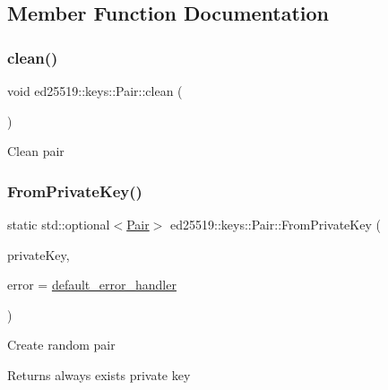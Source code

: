 \subsection{Member Function Documentation}
\mbox{\label{classed25519_1_1keys_1_1_pair_ae803e41096e0f6edb030e48713515aa2}} 
\subsubsection{\texorpdfstring{clean()}{clean()}}
{\footnotesize\ttfamily void ed25519\+::keys\+::\+Pair\+::clean (\begin{DoxyParamCaption}{ }\end{DoxyParamCaption})}

Clean pair \mbox{\label{classed25519_1_1keys_1_1_pair_aa4b34f7823cbba1e4243b9fbf2745e1e}} 
\subsubsection{\texorpdfstring{FromPrivateKey()}{FromPrivateKey()}}
{\footnotesize\ttfamily static std\+::optional$<$\mbox{\hyperlink{classed25519_1_1keys_1_1_pair}{Pair}}$>$ ed25519\+::keys\+::\+Pair\+::\+From\+Private\+Key (\begin{DoxyParamCaption}\item[{const std\+::string \&}]{private\+Key,  }\item[{const \mbox{\hyperlink{namespaceed25519_a6ba572942b3c18591fc869d52a6b16e6}{Error\+Handler}} \&}]{error = {\ttfamily \mbox{\hyperlink{namespaceed25519_a7c7bb6ed17541162959c33ed3e3b15fb}{default\+\_\+error\+\_\+handler}}} }\end{DoxyParamCaption})\hspace{0.3cm}{\ttfamily [static]}}

Create random pair \begin{DoxyReturn}{Returns}
always exists private key 
\end{DoxyReturn}
\mbox{\label{classed25519_1_1keys_1_1_pair_add9c9587c53dff8b1d5bc69a7a97f837}} 
